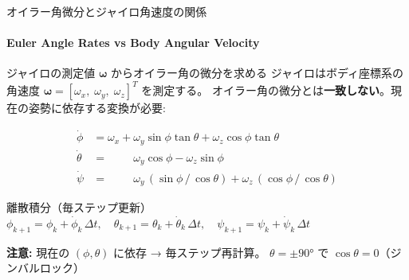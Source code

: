 \begin{frame}{オイラー角微分とジャイロ角速度の関係}
  \framesubtitle{Euler Angle Rates vs Body Angular Velocity}

  \begin{block}{ジャイロの測定値 $\boldsymbol{\omega}$ からオイラー角の微分を求める}
    {\small
    ジャイロはボディ座標系の角速度 $\boldsymbol{\omega} = [\omega_x,\;\omega_y,\;\omega_z]^T$ を測定する。
    オイラー角の微分とは\textbf{一致しない}。現在の姿勢に依存する変換が必要:
    }
  \end{block}

  \vspace{-1.0em}
  {\small
  \begin{align*}
    \dot{\phi}   &= \omega_x
                  + \omega_y \sin\phi\tan\theta
                  + \omega_z \cos\phi\tan\theta \\
    \dot{\theta} &= \phantom{\omega_x +{}}
                    \omega_y \cos\phi
                  - \omega_z \sin\phi \\
    \dot{\psi}   &= \phantom{\omega_x +{}}
                    \omega_y \,(\sin\phi\,/\,\cos\theta)
                  + \omega_z \,(\cos\phi\,/\,\cos\theta)
  \end{align*}
  }

  \vspace{-0.8em}

  \begin{exampleblock}{離散積分（毎ステップ更新）}
    {\small
    $\phi_{k+1} = \phi_k + \dot{\phi}_k\,\Delta t,\quad
    \theta_{k+1} = \theta_k + \dot{\theta}_k\,\Delta t,\quad
    \psi_{k+1} = \psi_k + \dot{\psi}_k\,\Delta t$
    }
  \end{exampleblock}

  \vspace{-0.2em}

  {\footnotesize
    \textbf{注意:}
    現在の $(\phi,\theta)$ に依存 → 毎ステップ再計算。
    $\theta{=}\pm 90°$ で $\cos\theta{=}0$（ジンバルロック）
  }
\end{frame}

